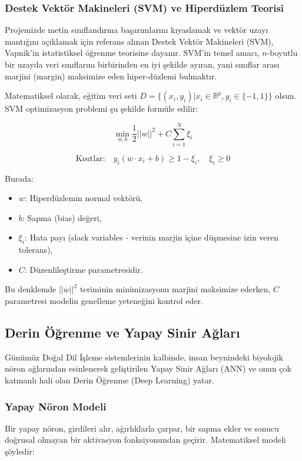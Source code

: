 \documentclass[12pt,a4paper]{report}
\begin{document}
\subsubsection{Destek Vektör Makineleri (SVM) ve Hiperdüzlem Teorisi}
Projemizde metin sınıflandırma başarımlarını kıyaslamak ve vektör uzayı mantığını açıklamak için referans alınan Destek Vektör Makineleri (SVM), Vapnik'in istatistiksel öğrenme teorisine dayanır. SVM'in temel amacı, $n$-boyutlu bir uzayda veri sınıflarını birbirinden en iyi şekilde ayıran, yani sınıflar arası marjini (margin) maksimize eden hiper-düzlemi bulmaktır.

Matematiksel olarak, eğitim veri seti $D = \{(x_i, y_i) | x_i \in \mathbb{R}^p, y_i \in \{-1, 1\}\}$ olsun. SVM optimizasyon problemi şu şekilde formüle edilir:

\begin{equation}
    \min_{w,b} \frac{1}{2} ||w||^2 + C \sum_{i=1}^{N} \xi_i
\end{equation}

\begin{equation}
    \text{Kısıtlar:} \quad y_i (w \cdot x_i + b) \geq 1 - \xi_i, \quad \xi_i \geq 0
\end{equation}

Burada:
\begin{itemize}
    \item $w$: Hiperdüzlemin normal vektörü,
    \item $b$: Sapma (bias) değeri,
    \item $\xi_i$: Hata payı (slack variables - verinin marjin içine düşmesine izin veren tolerans),
    \item $C$: Düzenlileştirme parametresidir.
\end{itemize}

Bu denklemde $||w||^2$ teriminin minimizasyonu marjini maksimize ederken, $C$ parametresi modelin genelleme yeteneğini kontrol eder.

\subsection{Derin Öğrenme ve Yapay Sinir Ağları}
Günümüz Doğal Dil İşleme sistemlerinin kalbinde, insan beynindeki biyolojik nöron ağlarından esinlenerek geliştirilen Yapay Sinir Ağları (ANN) ve onun çok katmanlı hali olan Derin Öğrenme (Deep Learning) yatar.

\subsubsection{Yapay Nöron Modeli}
Bir yapay nöron, girdileri alır, ağırlıklarla çarpar, bir sapma ekler ve sonucu doğrusal olmayan bir aktivasyon fonksiyonundan geçirir. Matematiksel modeli şöyledir:
\end{document}
